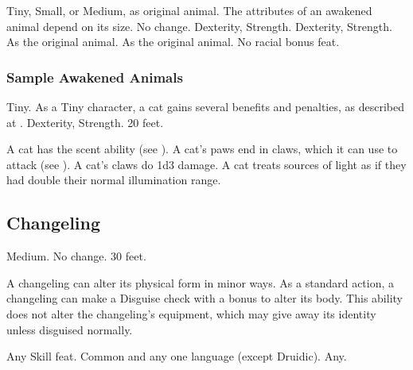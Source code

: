          Tiny, Small, or Medium, as original animal.
         The attributes of an awakened animal depend on its size.
         No change.
          Dexterity,  Strength.
          Dexterity,  Strength.
         As the original animal.
         As the original animal.
         No racial bonus feat.

        \subsubsection{Sample Awakened Animals}


             Tiny. As a Tiny character, a cat gains several benefits and penalties, as described at .
              Dexterity,  Strength.
             20 feet.
            \begin{itemize}
                 A cat has the scent ability (see ).
                 A cat's paws end in claws, which it can use to attack (see ). A cat's claws do 1d3 damage.
                 A cat treats sources of light as if they had double their normal illumination range.
            \end{itemize}

        \subsection{Changeling}

             Medium.
             No change.
             30 feet.
            \begin{itemize}
                 A changeling can alter its physical form in minor ways. As a standard action, a changeling can make a Disguise check with a  bonus to alter its body. This ability does not alter the changeling's equipment, which may give away its identity unless disguised normally.
            \end{itemize}
             Any Skill feat.
             Common and any one language (except Druidic).
             Any.

